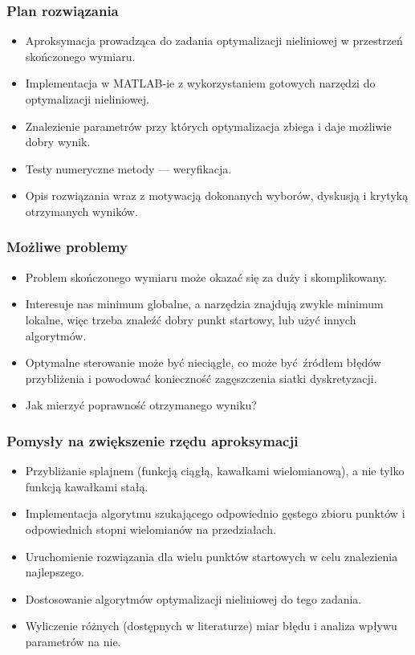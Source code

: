 \documentclass{beamer}
\begin{document}
\begin{frame}
  \frametitle{Plan rozwiązania}
  \begin{itemize}
  \item Aproksymacja prowadząca do zadania optymalizacji nieliniowej w przestrzeń skończonego wymiaru.
  \item Implementacja w MATLAB-ie z wykorzystaniem gotowych narzędzi do optymalizacji nieliniowej.
  \item Znalezienie parametrów przy których optymalizacja zbiega i daje możliwie dobry wynik.
  \item Testy numeryczne metody --- weryfikacja.
  \item Opis rozwiązania wraz z motywacją dokonanych wyborów, dyskusją i krytyką otrzymanych wyników.
  \end{itemize}
\end{frame}

\begin{frame}
  \frametitle{Możliwe problemy}
  \begin{itemize}
  \item Problem skończonego wymiaru może okazać się za duży i skomplikowany.
  \item Interesuje nas minimum globalne, a narzędzia znajdują zwykle minimum lokalne, więc trzeba znaleźć dobry punkt startowy, lub użyć innych algorytmów.
  \item Optymalne sterowanie może być nieciągłe, co może być źródłem błędów przybliżenia i powodować konieczność zagęszczenia siatki dyskretyzacji.
  \item Jak mierzyć poprawność otrzymanego wyniku?
  \end{itemize}
\end{frame}

\begin{frame}
  \frametitle{Pomysły na zwiększenie rzędu aproksymacji}
  \begin{itemize}
  \item Przybliżanie splajnem (funkcją ciągłą, kawałkami wielomianową), a nie tylko funkcją kawałkami stałą.
  \item Implementacja algorytmu szukającego odpowiednio gęstego zbioru punktów i odpowiednich stopni wielomianów na przedziałach.
  \item Uruchomienie rozwiązania dla wielu punktów startowych w celu znalezienia najlepszego.
  \item Dostosowanie algorytmów optymalizacji nieliniowej do tego zadania.
  \item Wyliczenie różnych (dostępnych w literaturze) miar błędu i analiza wpływu parametrów na nie.
  \end{itemize}
\end{frame}

\begin{frame}
\end{frame}
\end{document}
